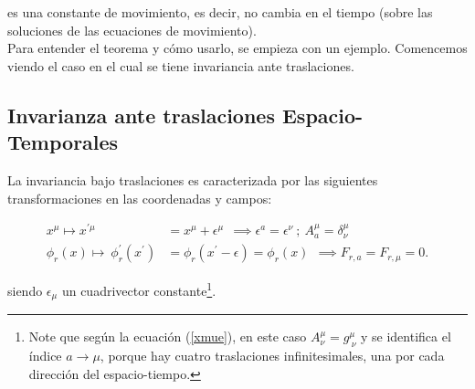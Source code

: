 \noindent
es una constante de movimiento,  es decir, no cambia en el tiempo (sobre las soluciones de las ecuaciones de movimiento).\\

\noindent
Para entender el teorema y cómo usarlo, se empieza con un ejemplo. Comencemos viendo el caso en el cual se tiene invariancia ante traslaciones.


\subsection{Invarianza ante traslaciones Espacio-Temporales}
La invariancia bajo traslaciones es caracterizada por las siguientes transformaciones en las coordenadas y campos:


\begin{equation}
\begin{split}
x^{\mu } \longmapsto x^{\prime \mu } & = x^{\mu }+\epsilon ^{\mu }~\ \implies \epsilon ^{a}=\epsilon ^{\nu }~;~A_{a}^{\mu }=\delta _{\nu }^{\mu } \\
\phi _{r}\left( x\right)  \longmapsto ~\phi _{r}^{\prime }\left( x^{\prime}\right) & = \phi_{r}\left( x^{\prime }-\epsilon \right) = \phi _{r}\left(x\right) ~\ \implies F_{r,a}=F_{r,\mu }=0.
\label{xpmut}
\end{split}
\end{equation}
\noindent

siendo $\epsilon_{\mu}$ un cuadrivector constante\footnote{Note que según la ecuación (\ref{xmue}), en este caso $A^{\mu}_{\nu}=g^{\mu}_{~\nu}$ y se identifica el índice $a \rightarrow \mu$, porque hay cuatro traslaciones infinitesimales, una por cada dirección del espacio-tiempo.}.



